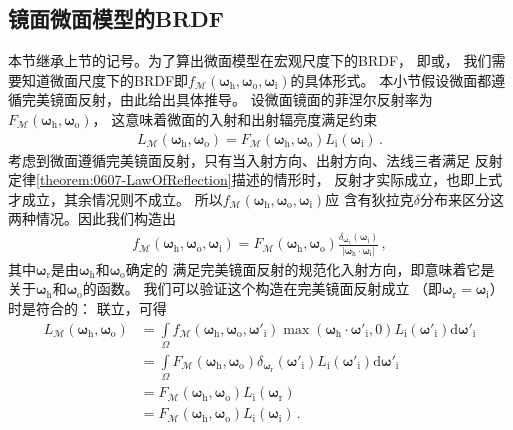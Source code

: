 \subsection{镜面微面模型的BRDF}\label{sub:镜面微面模型的BRDF}
本节继承上节的记号。为了算出微面模型在宏观尺度下的BRDF，
即或，
我们需要知道微面尺度下的BRDF即$f_{\mathcal{M}}({\bm\omega}_{\mathrm{h}},{\bm\omega}_{\mathrm{o}},{\bm\omega}_{\mathrm{i}})$的具体形式。
本小节假设微面都遵循完美镜面反射，由此给出具体推导。
设微面镜面的菲涅尔反射率为$F_{\mathcal{M}}({\bm\omega}_{\mathrm{h}},{\bm\omega}_{\mathrm{o}})$，
这意味着微面的入射和出射辐亮度满足约束
\begin{align}\label{eq:08ex01-FresnelMicrofacet}
    L_{\mathcal{M}}({\bm\omega}_{\mathrm{h}},{\bm\omega}_{\mathrm{o}})=F_{\mathcal{M}}({\bm\omega}_{\mathrm{h}},{\bm\omega}_{\mathrm{o}})L_{\mathrm{i}}({\bm\omega}_{\mathrm{i}})\, .
\end{align}
考虑到微面遵循完美镜面反射，只有当入射方向、出射方向、法线三者满足
反射定律\ref{theorem:0607-LawOfReflection}描述的情形时，
反射才实际成立，也即上式才成立，其余情况则不成立。
所以$f_{\mathcal{M}}({\bm\omega}_{\mathrm{h}},{\bm\omega}_{\mathrm{o}},{\bm\omega}_{\mathrm{i}})$应
含有狄拉克$\delta$分布来区分这两种情况。因此我们构造出
\begin{align}\label{eq:08ex01-FresnelBRDFMicrofacet}
    f_{\mathcal{M}}({\bm\omega}_{\mathrm{h}},{\bm\omega}_{\mathrm{o}},{\bm\omega}_{\mathrm{i}})
    =F_{\mathcal{M}}({\bm\omega}_{\mathrm{h}},{\bm\omega}_{\mathrm{o}})\frac{\delta_{{\bm\omega}_{\mathrm{r}}}({\bm\omega}_{\mathrm{i}})}{|{\bm\omega}_{\mathrm{h}}\cdot{\bm\omega}_{\mathrm{i}}|}\, ,
\end{align}
其中${\bm\omega}_{\mathrm{r}}$是由${\bm\omega}_{\mathrm{h}}$和${\bm\omega}_{\mathrm{o}}$确定的
满足完美镜面反射的规范化入射方向，即意味着它是
关于${\bm\omega}_{\mathrm{h}}$和${\bm\omega}_{\mathrm{o}}$的函数。
我们可以验证这个构造在完美镜面反射成立
（即${\bm\omega}_{\mathrm{r}}={\bm\omega}_{\mathrm{i}}$）时是符合的：
联立，可得
\begin{align}\label{eq:08ex01-FresnelBRDFValid}
    L_{\mathcal{M}}({\bm\omega}_{\mathrm{h}},{\bm\omega}_{\mathrm{o}})
     & =\int\limits_{\varOmega}f_{\mathcal{M}}({\bm\omega}_{\mathrm{h}},{\bm\omega}_{\mathrm{o}},{\bm\omega}'_{\mathrm{i}})
    \max({\bm\omega}_{\mathrm{h}}\cdot{\bm\omega}'_{\mathrm{i}},0)
    L_{\mathrm{i}}({\bm\omega}'_{\mathrm{i}})\mathrm{d}{\bm\omega}'_{\mathrm{i}}\nonumber                                   \\
     & =\int\limits_{\varOmega}F_{\mathcal{M}}({\bm\omega}_{\mathrm{h}},{\bm\omega}_{\mathrm{o}})
    \delta_{{\bm\omega}_{\mathrm{r}}}({\bm\omega}'_{\mathrm{i}})
    L_{\mathrm{i}}({\bm\omega}'_{\mathrm{i}})\mathrm{d}{\bm\omega}'_{\mathrm{i}}\nonumber                                   \\
     & =F_{\mathcal{M}}({\bm\omega}_{\mathrm{h}},{\bm\omega}_{\mathrm{o}})L_{\mathrm{i}}({\bm\omega}_{\mathrm{r}})\nonumber \\
     & =F_{\mathcal{M}}({\bm\omega}_{\mathrm{h}},{\bm\omega}_{\mathrm{o}})L_{\mathrm{i}}({\bm\omega}_{\mathrm{i}})\, .
\end{align}
